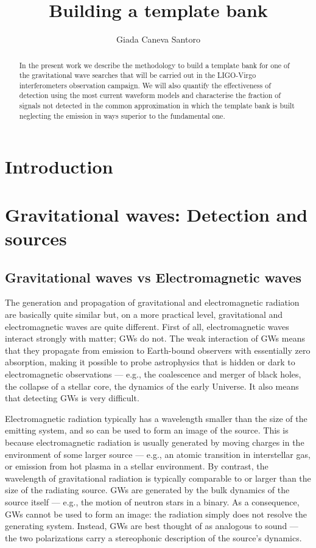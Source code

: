 \documentclass[binding=0.6cm, LaM]{sapthesis}
\title{Building a template bank}
\author{Giada Caneva Santoro}
\begin{document}
\frontmatter
\maketitle
\dedication{Fortsett å gå.}

\begin{abstract}
In the present work we describe the methodology to build a template bank for one of the gravitational wave searches that will be carried out in the LIGO-Virgo interferometers observation campaign. 
We will also quantify the effectiveness of detection using the most current waveform models and characterise the fraction of signals not detected in the common approximation in which the template 
bank is built neglecting the emission in ways superior to the fundamental one.
\end{abstract}

\tableofcontents

\mainmatter 




\chapter{Introduction}
\chapter{Gravitational waves: Detection and sources}
\section{Gravitational waves vs Electromagnetic waves}
The generation and propagation of gravitational and electromagnetic radiation are basically quite similar but, on a more practical level, gravitational and electromagnetic waves are quite different.
First of all, electromagnetic waves interact strongly with matter; GWs do not.
The weak interaction of GWs means that they propagate from emission to Earth-bound observers with essentially zero absorption, making it possible to probe astrophysics that is hidden or dark to
electromagnetic observations — e.g., the coalescence and merger of black holes, the collapse of a stellar core, the dynamics of the early Universe. It also means that detecting GWs is very difficult.

Electromagnetic radiation typically has a wavelength smaller than the size of the emitting system, and so can be used to form an image of the source.
 This is because electromagnetic radiation is usually generated by moving charges in the environment of some larger source — e.g., an atomic transition in interstellar gas, or emission from hot plasma
 in a stellar environment. By contrast, the wavelength of gravitational radiation is typically comparable to or larger than the size of the radiating source.
GWs are generated by the bulk dynamics of the source itself — e.g., the motion of neutron stars in a binary. As a consequence, GWs cannot be used to form an image: the radiation simply does not
resolve the generating system. Instead, GWs are best thought of as analogous to sound — the two polarizations carry a stereophonic description of the source’s dynamics.
\end{document}
